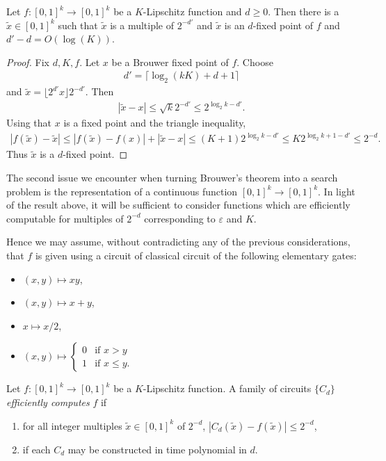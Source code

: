 \documentclass{article}
\begin{document}
\begin{lemma}
  Let $f:\left[{0,1}\right]^k\to\left[{0,1}\right]^k$ be a
  $K$-Lipschitz function and $d\geq 0$. Then there is a $\tilde x \in [0,1]^k$ such that $\tilde x$ is a multiple of $2^{-d'}$ and $\tilde x$
  is an $d$-fixed point of $f$ and $d'-d=O(\log(K))$.
  \begin{proof}
    Fix $d,K,f$. Let $x$ be a Brouwer fixed point of $f$.
    Choose
    \begin{align}\label{eq:d}
      d' = \lceil \log_2\left({kK}\right) + d + 1\rceil
    \end{align}
    and $\tilde x = \lfloor{2^{d'} x}\rfloor2^{-d'}$.
    Then
    \begin{align*}
      |\tilde x - x| \leq \sqrt{k} 2^{-d'} \leq 2^{\log_2 k-d'}.
    \end{align*}
    Using that $x$ is a fixed point and the triangle inequality,
    \begin{align*}
      |f(\tilde x)-\tilde x| \leq |f(\tilde x)-f(x)|+|\tilde x - x|
      \leq (K+1)2^{\log_2 k-d'} \leq K2^{\log_2 k+1-d'}\leq 2^{-d}.
    \end{align*}
    Thus $\tilde x$ is a $d$-fixed point.
  \end{proof}
\end{lemma}

The second issue we encounter when turning Brouwer's theorem into
a search problem is the representation of a continuous function
$\left[{0,1}\right]^k\to\left[{0,1}\right]^k$. In light of the result
above, it will be sufficient to consider functions which are
efficiently computable for multiples of $2^{-d}$ corresponding
to $\varepsilon$ and $K$.

Hence we may assume, without contradicting
any of the previous considerations, that $f$ is given using a
circuit of classical circuit of the following elementary gates:

\begin{itemize}
  \item $(x,y)\mapsto xy$,
  \item $(x,y)\mapsto x + y$,
  \item $x\mapsto x/2$,
  \item $(x,y)\mapsto \begin{cases}
      0 & \text{if }x>y \\
      1 & \text{if }x\leq y.
    \end{cases}$
\end{itemize}

\begin{definition}
  Let $f:\left[{0,1}\right]^k\to\left[{0,1}\right]^k$ be a
  $K$-Lipschitz function. A family of circuits $\{C_d\}$ \emph{efficiently computes} $f$ if
  \begin{enumerate}

    \item for all integer multiples $\tilde x\in\left[{0,1}\right]^k$ of $2^{-d}$, $|C_d(\tilde x) - f(\tilde x)|\leq 2^{-d}$,
    \item if each $C_d$ may be constructed in time
      polynomial in $d$.
  \end{enumerate}
\end{definition}
\end{document}
